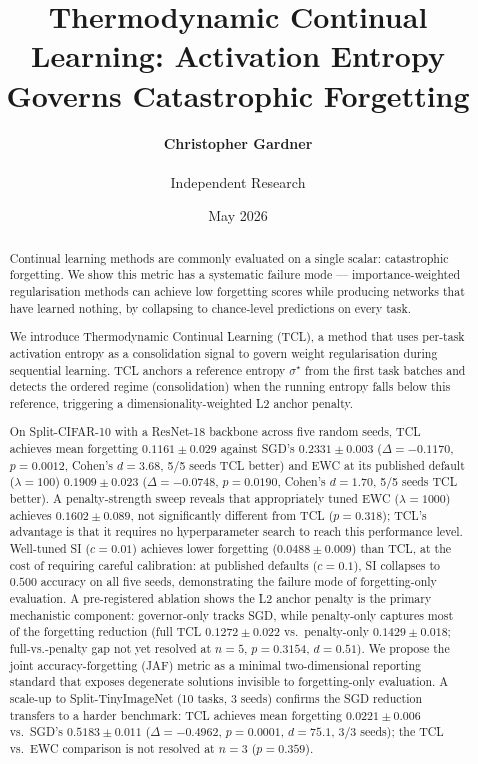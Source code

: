 \documentclass[10pt,a4paper]{article}
\begin{document}
\title{Thermodynamic Continual Learning: Activation Entropy Governs Catastrophic Forgetting}
\author{\textbf{Christopher Gardner} \\\\ \small Independent Research}
\date{May 2026}
\maketitle

\begin{abstract}
Continual learning methods are commonly evaluated on a single scalar: catastrophic
forgetting. We show this metric has a systematic failure mode --- importance-weighted
regularisation methods can achieve low forgetting scores while producing networks that
have learned nothing, by collapsing to chance-level predictions on every task.

We introduce Thermodynamic Continual Learning (TCL), a method that uses per-task
activation entropy as a consolidation signal to govern weight regularisation during
sequential learning. TCL anchors a reference entropy $\sigma^\star$ from the first
task batches and detects the ordered regime (consolidation) when the running entropy
falls below this reference, triggering a dimensionality-weighted L2 anchor penalty.

On Split-CIFAR-10 with a ResNet-18 backbone across five random seeds, TCL achieves
mean forgetting $0.1161 \pm 0.029$ against SGD's $0.2331 \pm 0.003$
($\Delta = -0.1170$, $p = 0.0012$, Cohen's $d = 3.68$, 5/5 seeds TCL
better) and EWC at its published default ($\lambda = 100$) $0.1909 \pm 0.023$
($\Delta = -0.0748$, $p = 0.0190$, Cohen's $d = 1.70$, 5/5 seeds TCL
better). A penalty-strength sweep reveals that appropriately tuned EWC
($\lambda = 1000$) achieves $0.1602 \pm 0.089$, not significantly different from TCL
($p = 0.318$); TCL's advantage is that it requires no hyperparameter search to reach
this performance level. Well-tuned SI ($c = 0.01$) achieves lower forgetting
($0.0488 \pm 0.009$) than TCL, at the cost of requiring careful calibration: at
published defaults ($c = 0.1$), SI collapses to $0.500$ accuracy on all five seeds,
demonstrating the failure mode of forgetting-only evaluation.
A pre-registered ablation shows the L2 anchor penalty is the primary mechanistic
component: governor-only tracks SGD, while penalty-only captures most of the
forgetting reduction (full TCL $0.1272 \pm 0.022$ vs.~penalty-only
$0.1429 \pm 0.018$; full-vs.-penalty gap not yet resolved at $n=5$,
$p = 0.3154$, $d = 0.51$). We propose the joint accuracy-forgetting (JAF) metric as
a minimal two-dimensional reporting standard that exposes degenerate solutions
invisible to forgetting-only evaluation. A scale-up to Split-TinyImageNet
(10 tasks, 3 seeds) confirms the SGD reduction transfers to a harder benchmark:
TCL achieves mean forgetting $0.0221 \pm 0.006$ vs.\ SGD's $0.5183 \pm 0.011$
($\Delta = -0.4962$, $p = 0.0001$, $d = 75.1$, 3/3 seeds); the TCL vs.\ EWC
comparison is not resolved at $n = 3$ ($p = 0.359$).
\end{abstract}
\end{document}
